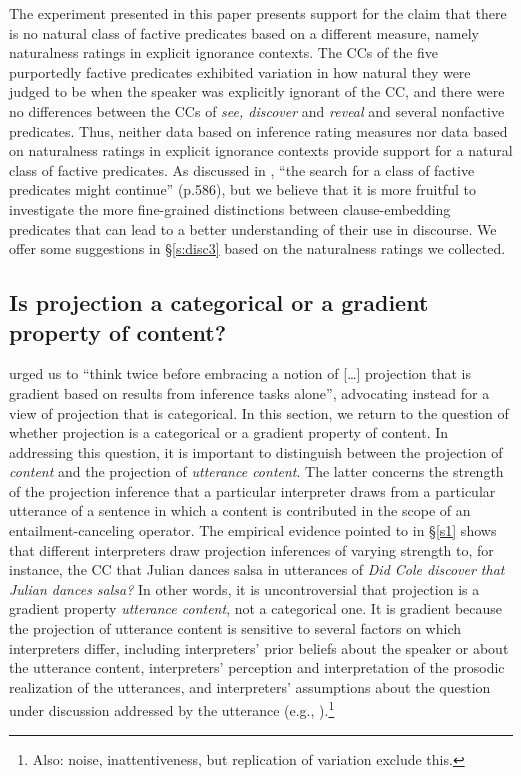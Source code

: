 \documentclass[11pt,fleqn]{article}
\newcommand{\6}{\mbox{$[\hspace*{-.6mm}[$}}
\newcommand{\9}{\mbox{$]\hspace*{-.6mm}]$}}
\begin{document}
The experiment presented in this paper presents support for the claim that there is no natural class of factive predicates based on a different measure, namely naturalness ratings in explicit ignorance contexts. The CCs of the five purportedly factive predicates exhibited variation in how natural they were judged to be when the speaker was explicitly ignorant of the CC, and there were no differences between the CCs of {\em see, discover} and {\em reveal} and several nonfactive predicates. Thus, neither data based on inference rating measures nor data based on naturalness ratings in explicit ignorance contexts provide support for a natural class of factive predicates. As discussed in \citealt{degen-tonhauser-language}, ``the search for a class of factive predicates might continue'' (p.586), but we believe that it is more fruitful to investigate the more fine-grained distinctions between clause-embedding predicates that can lead to a better understanding of their use in discourse. We offer some suggestions in \S\ref{s:disc3} based on the naturalness ratings we collected.


\subsection{Is projection a categorical or a gradient property of content?}

\citealt[497]{mandelkern-etal2020} urged us to ``think twice before embracing a notion of [\ldots] projection that is gradient based on results from inference tasks alone'', advocating instead for a view of projection that is categorical. In this section, we return to the question of whether projection is a categorical or a gradient property of content. In addressing this question, it is important to distinguish between the projection of {\em content} and the projection of {\em utterance content}. The latter concerns the strength of the projection inference that a particular interpreter draws from a particular utterance of a sentence in which a content is contributed in the scope of an entailment-canceling operator. The empirical evidence pointed to in \S\ref{s1} shows that different interpreters draw projection inferences of varying strength to, for instance, the CC that Julian dances salsa in utterances of {\em Did Cole discover that Julian dances salsa?} In other words, it is uncontroversial that projection is a gradient property {\em utterance content}, not a categorical one. It is gradient because the projection of utterance content is sensitive to several factors on which  interpreters differ, including interpreters' prior beliefs about the speaker or about the utterance content, interpreters' perception and interpretation of the prosodic realization of the utterances, and interpreters' assumptions about the question under discussion addressed by the utterance (e.g., \citealt{djaerv-bacovcin2020,degen-tonhauser-openmind,mahler2020,mahler-thesis,tonhauser-salt26,tbd-variability,tonhauser-etal-sub23}).\footnote{Also: noise, inattentiveness, but replication of variation exclude this.} 
\end{document}
